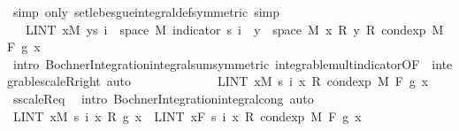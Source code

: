 \begin{isabellebody}
\ {\isacharparenleft}{\kern0pt}simp\ only{\isacharcolon}{\kern0pt}\ set{\isacharunderscore}{\kern0pt}lebesgue{\isacharunderscore}{\kern0pt}integral{\isacharunderscore}{\kern0pt}def{\isacharbrackleft}{\kern0pt}symmetric{\isacharbrackright}{\kern0pt}{\isacharparenright}{\kern0pt}\ simp\isanewline
\ \ \ \ \ \ \ \ \isamarkupfalse%
\ \isamarkupfalse%
\ {\isachardoublequoteopen}{\isachardot}{\kern0pt}{\isachardot}{\kern0pt}{\isachardot}{\kern0pt}\ {\isacharequal}{\kern0pt}\ LINT\ x{\isacharbar}{\kern0pt}M{\isachardot}{\kern0pt}\ {\isacharparenleft}{\kern0pt}{\isasymSum}y{\isasymin}s\ i\ {\isacharbackquote}{\kern0pt}\ space\ M{\isachardot}{\kern0pt}\ indicator\ {\isacharparenleft}{\kern0pt}s\ i\ {\isacharminus}{\kern0pt}{\isacharbackquote}{\kern0pt}\ {\isacharbraceleft}{\kern0pt}y{\isacharbraceright}{\kern0pt}\ {\isasyminter}\ space\ M{\isacharparenright}{\kern0pt}\ x\ {\isacharasterisk}{\kern0pt}\isactrlsub R\ y\ {\isacharasterisk}{\kern0pt}\isactrlsub R\ cond{\isacharunderscore}{\kern0pt}exp\ M\ F\ g\ x{\isacharparenright}{\kern0pt}{\isachardoublequoteclose}\ \isamarkupfalse%
\ {\isacharparenleft}{\kern0pt}intro\ Bochner{\isacharunderscore}{\kern0pt}Integration{\isachardot}{\kern0pt}integral{\isacharunderscore}{\kern0pt}sum{\isacharbrackleft}{\kern0pt}symmetric{\isacharbrackright}{\kern0pt}\ integrable{\isacharunderscore}{\kern0pt}mult{\isacharunderscore}{\kern0pt}indicator{\isacharbrackleft}{\kern0pt}OF\ {\isacharunderscore}{\kern0pt}\ integrable{\isacharunderscore}{\kern0pt}scaleR{\isacharunderscore}{\kern0pt}right{\isacharbrackright}{\kern0pt}{\isacharparenright}{\kern0pt}\ auto\isanewline
\ \ \ \ \ \ \ \ \isamarkupfalse%
\ \isamarkupfalse%
\ {\isachardoublequoteopen}{\isachardot}{\kern0pt}{\isachardot}{\kern0pt}{\isachardot}{\kern0pt}\ {\isacharequal}{\kern0pt}\ LINT\ x{\isacharbar}{\kern0pt}M{\isachardot}{\kern0pt}\ s\ i\ x\ {\isacharasterisk}{\kern0pt}\isactrlsub R\ cond{\isacharunderscore}{\kern0pt}exp\ M\ F\ g\ x{\isachardoublequoteclose}\ \isamarkupfalse%
\ s{\isacharunderscore}{\kern0pt}scaleR{\isacharunderscore}{\kern0pt}eq\ \isamarkupfalse%
\ {\isacharparenleft}{\kern0pt}intro\ Bochner{\isacharunderscore}{\kern0pt}Integration{\isachardot}{\kern0pt}integral{\isacharunderscore}{\kern0pt}cong{\isacharparenright}{\kern0pt}\ auto\isanewline
\ \ \ \ \ \ \ \ \isamarkupfalse%
\ \isamarkupfalse%
\ {\isachardoublequoteopen}LINT\ x{\isacharbar}{\kern0pt}M{\isachardot}{\kern0pt}\ s\ i\ x\ {\isacharasterisk}{\kern0pt}\isactrlsub R\ g\ x\ {\isacharequal}{\kern0pt}\ LINT\ x{\isacharbar}{\kern0pt}{\isacharquery}{\kern0pt}F{\isachardot}{\kern0pt}\ s\ i\ x\ {\isacharasterisk}{\kern0pt}\isactrlsub R\ cond{\isacharunderscore}{\kern0pt}exp\ M\ F\ g\ x{\isachardoublequoteclose}\ \isamarkupfalse%

\end{isabellebody}
